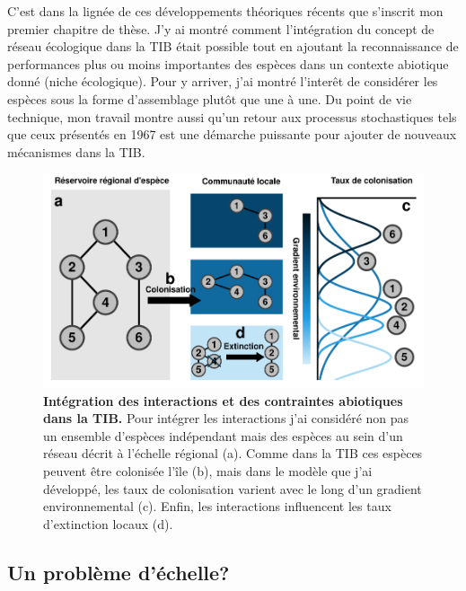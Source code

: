 C'est dans la lignée de ces développements théoriques récents que
s'inscrit mon premier chapitre de thèse. J'y ai montré comment
l'intégration du concept de réseau écologique dans la TIB était possible
tout en ajoutant la reconnaissance de performances plus ou moins
importantes des espèces dans un contexte abiotique donné (niche
écologique). Pour y arriver, j'ai montré l'interêt de considérer les
espèces sous la forme d'assemblage plutôt que une à une. Du point de vie
technique, mon travail montre aussi qu'un retour aux processus
stochastiques tels que ceux présentés en 1967 est une démarche puissante
pour ajouter de nouveaux mécanismes dans la TIB.

\begin{figure}[htbp]
\centering
\includegraphics{fig/fig2.pdf}
\caption{\textbf{Intégration des interactions et des contraintes
abiotiques dans la TIB.} Pour intégrer les interactions j'ai considéré
non pas un ensemble d'espèces indépendant mais des espèces au sein d'un
réseau décrit à l'échelle régional (a). Comme dans la TIB ces espèces
peuvent être colonisée l'île (b), mais dans le modèle que j'ai
développé, les taux de colonisation varient avec le long d'un gradient
environnemental (c). Enfin, les interactions influencent les taux
d'extinction locaux (d).\label{fig:figGTIB}}
\end{figure}

\subsection*{Un problème d'échelle?}\label{un-probluxe8me-duxe9chelle}

